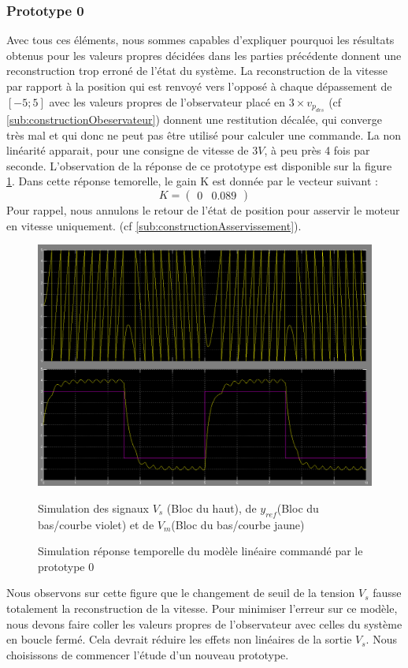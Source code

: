 \subsubsection{Prototype 0}
Avec tous ces éléments, nous sommes capables d'expliquer pourquoi les résultats obtenus pour les valeurs propres décidées dans les parties précédente donnent une reconstruction trop erroné de l'état du système. La reconstruction de la vitesse par rapport à la position qui est renvoyé vers l'opposé à chaque dépassement de $[-5;5]$ avec les valeurs propres de l'observateur placé en $3\times v_{p_{des}}$ (cf \ref{sub:constructionObeservateur}) donnent une restitution décalée, qui converge très mal et qui donc ne peut pas être utilisé pour calculer une commande. La non linéarité apparait, pour une consigne de vitesse de $3V$, à peu près 4 fois par seconde. L'observation de la réponse de ce prototype est disponible sur la figure \ref{fig:repNL_proto0}. Dans cette réponse temorelle, le gain K est donnée par le vecteur suivant :
\begin{equation}\label{eqn:gainRetourEtat}
K = \begin{pmatrix}
0& 0.089
\end{pmatrix}
\end{equation}
Pour rappel, nous annulons le retour de l'état de position pour asservir le moteur en vitesse uniquement. (cf \ref{sub:constructionAsservissement}).
\begin{figure}[!ht]
\centering
\includegraphics[width = .8\textwidth]{./IV/images/NL_simulation_observateurtropRapide.PNG}
\caption{Simulation réponse temporelle du modèle linéaire commandé par le prototype 0\label{fig:repNL_proto0}}
Simulation des signaux $V_s$ (Bloc du haut), de $y_{ref}$(Bloc du bas/courbe violet) et de $V_m$(Bloc du bas/courbe jaune)
\end{figure}
Nous observons sur cette figure que le changement de seuil de la tension $V_s$ fausse totalement la reconstruction de la vitesse. Pour minimiser l'erreur sur ce modèle, nous devons faire coller les valeurs propres de l'observateur avec celles du système en boucle fermé. Cela devrait réduire les effets non linéaires de la sortie $V_s$. Nous choisissons de commencer l'étude d'un nouveau prototype.

